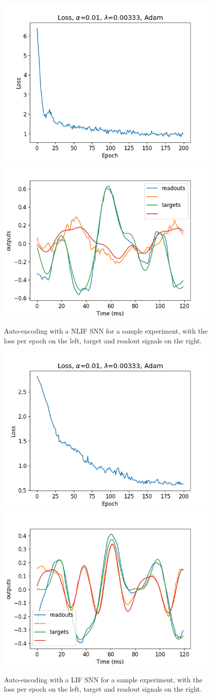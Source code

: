 \documentclass[mphil,deptreport,ianc]{infthesis} %
\begin{document}
\begin{figure}
    \centering
    \includegraphics[width=0.49\columnwidth]{figures/Gating/AutoEncoding/NLIF_sample/plot_loss_test_mt_NLIF_et_AutoEncoding_N_30_titers_200.png}
    \includegraphics[width=0.49\columnwidth]{figures/Gating/AutoEncoding/NLIF_sample/test_plot_outputs_NLIF_seed_23.png}
    \caption{Auto-encoding with a NLIF SNN for a sample experiment, with the loss per epoch on the left, target and readout signals on the right.}
    \label{fig:autoencoding_NLIF}
\end{figure}


\begin{figure}
    \centering
    \includegraphics[width=0.49\columnwidth]{figures/Gating/AutoEncoding/LIF_sample/plot_loss_test_mt_LIF_et_AutoEncoding_N_30_titers_200.png}
    \includegraphics[width=0.49\columnwidth]{figures/Gating/AutoEncoding/LIF_sample/test_plot_outputs_LIF_seed_25.png}
    \caption{Auto-encoding with a LIF SNN for a sample experiment, with the loss per epoch on the left, target and readout signals on the right.}
    \label{fig:autoencoding_LIF}
\end{figure}
\end{document}
